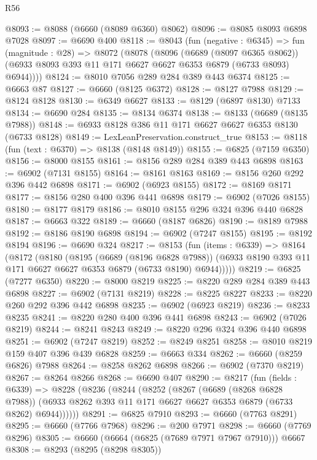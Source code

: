 \begin{lexlean}{R56}
\begin{coremodule}
{{{{{{{{{{{{{{{{{{{{{{{{{{{{{{{{{{{{{{{{{{{{{{{{{{{{{{{{{{{{{{{{{{{{{{{{{{{{{{{{{{{{{{{{{{{{{{{{{{{{{{{{{{{{{{{{{{{{{{{{{{{{{{{{{{{{{{{{{{{{{{{{{{{{{{{{{{{{{{{{{{{{{{{{{{{{{{{{{{{{{{{{{{{{{{{{{{{{{{{{{{{{{{{{{{{@8093 := @8088 (@6660 (@8089 @6360) @8062)
@8096 := @8085 @8093 @6898 @7028
@8097 := @6690 @400
@8118 := @8043
    (fun (negative : @6345) =>
    fun (magnitude : @28) =>
    @8072
      (@8078
        (@8096
          (@6689 (@8097 @6365 @8062))
          (@6933 @8093 @393 @11 @171 @6627 @6627 @6353 @6879 (@6733 @8093) @6944))))
@8124 := @8010 @7056 @289 @284 @389 @443 @6374
@8125 := @6663 @87
@8127 := @6660 (@8125 @6372)
@8128 := @8127 @7988
@8129 := @8124 @8128
@8130 := @6349 @6627
@8133 := @8129 (@6897 @8130) @7133
@8134 := @6690 @284
@8135 := @8134 @6374
@8138 := @8133 (@6689 (@8135 @7988))
@8148 := @6933 @8128 @386 @11 @171 @6627 @6627 @6353 @8130 (@6733 @8128)
@8149 := LexLeanPreservation.construct_true
@8153 := @8118 (fun (text : @6370) => @8138 (@8148 @8149))
@8155 := @6825 (@7159 @6350)
@8156 := @8000 @8155
@8161 := @8156 @289 @284 @389 @443 @6898
@8163 := @6902 (@7131 @8155)
@8164 := @8161 @8163
@8169 := @8156 @260 @292 @396 @442 @6898
@8171 := @6902 (@6923 @8155)
@8172 := @8169 @8171
@8177 := @8156 @280 @400 @396 @441 @6898
@8179 := @6902 (@7026 @8155)
@8180 := @8177 @8179
@8186 := @8010 @8155 @296 @324 @396 @440 @6828
@8187 := @6663 @322
@8189 := @6660 (@8187 @6826)
@8190 := @8189 @7988
@8192 := @8186 @8190 @6898
@8194 := @6902 (@7247 @8155)
@8195 := @8192 @8194
@8196 := @6690 @324
@8217 := @8153
    (fun (items : @6339) =>
    @8164
      (@8172
        (@8180
          (@8195
            (@6689 (@8196 @6828 @7988))
            (@6933 @8190 @393 @11 @171 @6627 @6627 @6353 @6879 (@6733 @8190) @6944)))))
@8219 := @6825 (@7277 @6350)
@8220 := @8000 @8219
@8225 := @8220 @289 @284 @389 @443 @6898
@8227 := @6902 (@7131 @8219)
@8228 := @8225 @8227
@8233 := @8220 @260 @292 @396 @442 @6898
@8235 := @6902 (@6923 @8219)
@8236 := @8233 @8235
@8241 := @8220 @280 @400 @396 @441 @6898
@8243 := @6902 (@7026 @8219)
@8244 := @8241 @8243
@8249 := @8220 @296 @324 @396 @440 @6898
@8251 := @6902 (@7247 @8219)
@8252 := @8249 @8251
@8258 := @8010 @8219 @159 @407 @396 @439 @6828
@8259 := @6663 @334
@8262 := @6660 (@8259 @6826) @7988
@8264 := @8258 @8262 @6898
@8266 := @6902 (@7370 @8219)
@8267 := @8264 @8266
@8268 := @6690 @407
@8290 := @8217
    (fun (fields : @6339) =>
    @8228
      (@8236
        (@8244
          (@8252
            (@8267
              (@6689 (@8268 @6828 @7988))
              (@6933 @8262 @393 @11 @171 @6627 @6627 @6353 @6879 (@6733 @8262) @6944))))))
@8291 := @6825 @7910
@8293 := @6660 (@7763 @8291)
@8295 := @6660 (@7766 @7968)
@8296 := @200 @7971
@8298 := @6660 (@7769 @8296)
@8305 := @6660 (@6664 (@6825 (@7689 @7971 @7967 @7910))) @6667
@8308 := @8293 (@8295 (@8298 @8305))
}}}}}}}}}}}}}}}}}}}}}}}}}}}}}}}}}}}}}}}}}}}}}}}}}}}}}}}}}}}}}}}}}}}}}}}}}}}}}}}}}}}}}}}}}}}}}}}}}}}}}}}}}}}}}}}}}}}}}}}}}}}}}}}}}}}}}}}}}}}}}}}}}}}}}}}}}}}}}}}}}}}}}}}}}}}}}}}}}}}}}}}}}}}}}}}}}}}}}}}}}}}}}}}}}}}
\end{coremodule}
\end{lexlean}
